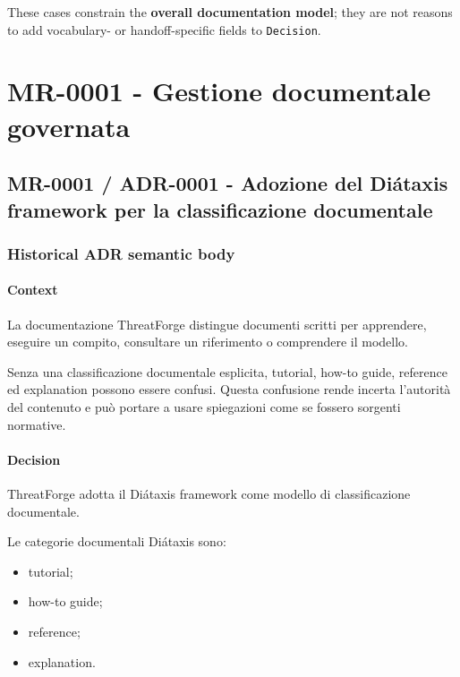 \documentclass[
  10pt,
]{article}
\providecommand{\tightlist}{%
  \setlength{\itemsep}{0pt}\setlength{\parskip}{0pt}}
\begin{document}
These cases constrain the \textbf{overall documentation model}; they are
not reasons to add vocabulary- or handoff-specific fields to
\texttt{Decision}.

\newpage

\section{MR-0001 - Gestione documentale
governata}\label{mr-0001---gestione-documentale-governata}

\subsection{MR-0001 / ADR-0001 - Adozione del Diátaxis framework per la
classificazione
documentale}\label{mr-0001-adr-0001---adozione-del-diuxe1taxis-framework-per-la-classificazione-documentale}

\subsubsection{Historical ADR semantic
body}\label{historical-adr-semantic-body}

\paragraph{Context}\label{context}

La documentazione ThreatForge distingue documenti scritti per
apprendere, eseguire un compito, consultare un riferimento o comprendere
il modello.

Senza una classificazione documentale esplicita, tutorial, how-to guide,
reference ed explanation possono essere confusi. Questa confusione rende
incerta l'autorità del contenuto e può portare a usare spiegazioni come
se fossero sorgenti normative.

\paragraph{Decision}\label{decision}

ThreatForge adotta il Diátaxis framework come modello di classificazione
documentale.

Le categorie documentali Diátaxis sono:

\begin{itemize}
\tightlist
\item
  tutorial;
\item
  how-to guide;
\item
  reference;
\item
  explanation.
\end{itemize}
\end{document}
